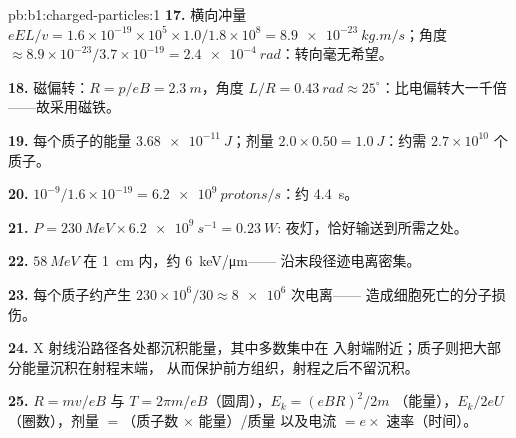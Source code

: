 \begin{solution}{pb:b1:charged-particles:1}
\textbf{17.} 横向冲量 $eEL/v = 1.6\times10^{-19} \times 10^5 \times
1.0/1.8\times10^8 = \qty{8.9e-23}{kg.m/s}$；角度 $\approx 8.9\times10^{-23}/
3.7\times10^{-19} = \qty{2.4e-4}{rad}$：转向毫无希望。

\textbf{18.} 磁偏转：$R = p/eB = \qty{2.3}{m}$，角度 $L/R = \qty{0.43}{rad}
\approx 25^\circ$：比电偏转大一千倍——故采用磁铁。

\textbf{19.} 每个质子的能量 $\qty{3.68e-11}{J}$；剂量 $2.0 \times 0.50 =
\qty{1.0}{J}$：约需 $2.7\times10^{10}$ 个质子。

\textbf{20.} $10^{-9}/1.6\times10^{-19} = \qty{6.2e9}{protons/s}$：约
\qty{4.4}{s}。

\textbf{21.} $P = \qty{230}{MeV} \times \qty{6.2e9}{s^{-1}} = \qty{0.23}{W}$:
夜灯，恰好输送到所需之处。

\textbf{22.} $\qty{58}{MeV}$ 在 \qty{1}{cm} 内，约 \qty{6}{keV/\micro m}——
沿末段径迹电离密集。

\textbf{23.} 每个质子约产生 $230\times10^6/30 \approx \num{8e6}$ 次电离——
造成细胞死亡的分子损伤。

\textbf{24.} X 射线沿路径各处都沉积能量，其中多数集中在
入射端附近；质子则把大部分能量沉积在射程末端，
从而保护前方组织，射程之后不留沉积。

\textbf{25.} $R = mv/eB$ 与 $T = 2\pi m/eB$（圆周），$E_k = (eBR)^2/2m$
（能量），$E_k/2eU$（圈数），剂量 $=$（质子数 $\times$ 能量）/质量
以及电流 $= e \times$ 速率（时间）。
\end{solution}
